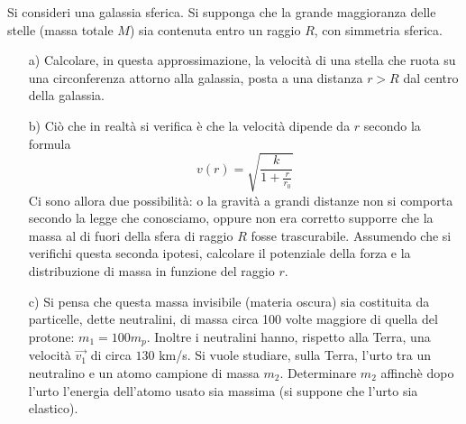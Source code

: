 \documentclass[../main.tex]{subfiles}
\begin{document}

\textex
Si consideri una galassia sferica. Si supponga che la grande maggioranza delle stelle (massa totale $M$) sia contenuta entro un raggio $R$, con simmetria sferica.
\begin{itemize}
\item[a)] Calcolare, in questa approssimazione, la velocità di una stella che ruota su una circonferenza attorno alla galassia, posta a una distanza $r > R$ dal centro della galassia.
\item[b)] Ciò che in realtà si verifica è che la velocità dipende da $r$ secondo la formula
$$ v(r) = \sqrt{\frac{k}{1+\frac{r}{r_0}}}$$
Ci sono allora due possibilità: o la gravità a grandi distanze non si comporta secondo la legge che conosciamo, oppure non era corretto supporre che la massa al di fuori della sfera di raggio $R$ fosse trascurabile.
Assumendo che si verifichi questa seconda ipotesi, calcolare il potenziale della forza e la distribuzione di massa in funzione del raggio $r$.
\item[c)] Si pensa che questa massa invisibile (materia oscura) sia costituita da particelle, dette neutralini, di massa circa 100 volte maggiore di quella del protone: $m_1 = 100 m_p$.
Inoltre i neutralini hanno, rispetto alla Terra, una velocità $\overrightarrow{v_1}$ di circa $130$ km/s.
Si vuole studiare, sulla Terra, l'urto tra un neutralino e un atomo campione di massa $m_2$. Determinare $m_2$ affinchè dopo l'urto l'energia dell'atomo usato sia massima (si suppone che l'urto sia elastico).
\end{itemize}
\end{document}
